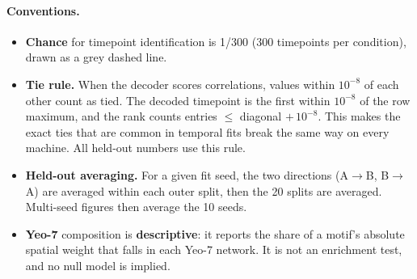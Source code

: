 \paragraph{Conventions.}
\begin{itemize}
  \item \textbf{Chance} for timepoint identification is 1/300 (300 timepoints per condition), drawn as a grey dashed line.
  \item \textbf{Tie rule.} When the decoder scores correlations, values within $10^{-8}$ of each other count as tied. The decoded timepoint is the first within $10^{-8}$ of the row maximum, and the rank counts entries $\leq$ diagonal $+\,10^{-8}$. This makes the exact ties that are common in temporal fits break the same way on every machine. All held-out numbers use this rule.
  \item \textbf{Held-out averaging.} For a given fit seed, the two directions (A$\to$B, B$\to$A) are averaged within each outer split, then the 20 splits are averaged. Multi-seed figures then average the 10 seeds.
  \item \textbf{Yeo-7} composition is \textbf{descriptive}: it reports the share of a motif's absolute spatial weight that falls in each Yeo-7 network. It is not an enrichment test, and no null model is implied.
\end{itemize}
